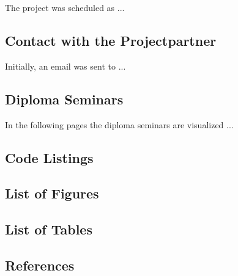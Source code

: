 \documentclass[12pt]{article}
\begin{document}
The project was scheduled as ...


\subsection{Contact with the Projectpartner }

Initially, an email was sent to ...


\subsection{Diploma Seminars}

In the following pages the diploma seminars are visualized ...



\subsection{Code Listings}
\lstlistoflistings

\subsection{List of Figures}
\listoffigures

\subsection{List of Tables}
\listoftables

\subsection{References}
\printbibliography[heading=none]
\end{document}
